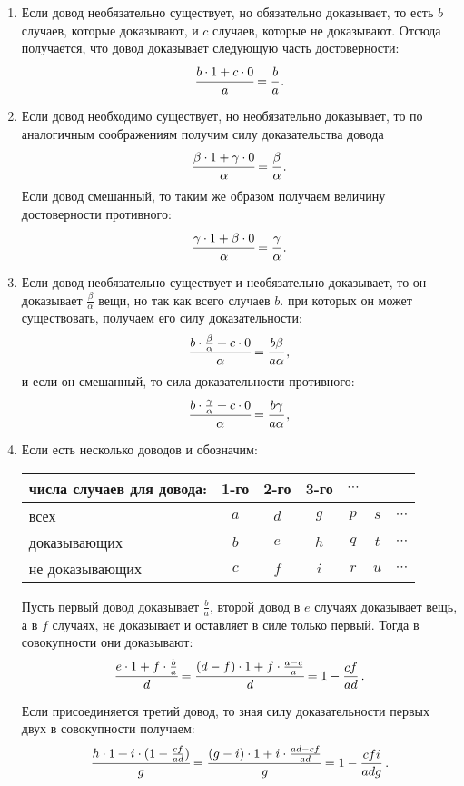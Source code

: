 \documentclass[12pt]{extarticle}
\begin{document}
\begin{enumerate}
\item Если довод необязательно существует, но обязательно доказывает, то есть $b$ случаев, которые доказывают, и $c$ случаев, которые не доказывают. Отсюда получается, что довод доказывает следующую часть достоверности: $$\cfrac{b \cdot 1 + c \cdot 0}{a} = \cfrac{b}{a} \, .$$

\item Если довод необходимо существует, но необязательно доказывает, то по аналогичным соображениям получим силу доказательства довода $$\cfrac{\beta \cdot 1 + \gamma \cdot 0}{\alpha} = \cfrac{\beta}{\alpha} \, .$$
Если довод смешанный, то таким же образом получаем величину достоверности противного: $$\cfrac{\gamma \cdot 1 + \beta \cdot 0}{\alpha} = \cfrac{\gamma}{\alpha} \, .$$

\item Если довод необязательно существует и необязательно доказывает, то он доказывает $\frac{\beta}{\alpha}$ вещи, но так как всего случаев $b$. при которых он может существовать, получаем его силу доказательности: $$\cfrac{b \cdot \frac{\beta}{\alpha} + c \cdot 0}{\alpha} = \cfrac{b \beta}{a \alpha}  \, ,$$
и если он смешанный, то сила доказательности противного:$$\cfrac{b \cdot \frac{\gamma}{\alpha} + c \cdot 0}{\alpha} = \cfrac{b \gamma}{a \alpha} \, ,$$

\item Если есть несколько доводов и обозначим:

\hspace{5pt}
\begin{tabular}{l|cccccc}
числа случаев для довода: & 1-го & 2-го & 3-го & $\cdots$  \\
\hline
всех & $a$ & $d$ & $g$ & $p$ & $s$ & $\cdots$ \\
доказывающих & $b$ & $e$ & $h$ & $q$ & $t$ &$\cdots$ \\
не доказывающих & $c$ & $f$ & $i$ & $r$ & $u$ & $\cdots$ \\
\end{tabular}

\hspace{5pt}
Пусть первый довод доказывает $\frac{b}{a}$, второй довод в $e$ случаях доказывает вещь, а в $f$ случаях, не доказывает и оставляет в силе только первый. Тогда в совокупности они доказывают:
$$\cfrac{e \cdot 1 + f \cdot \frac{b}{a}}{d} = \cfrac{(d - f) \cdot 1 +f \cdot \frac{a - c}{a}}{d} = 1 - \frac{cf}{ad} \, .$$

Если присоединяется третий довод, то зная силу доказательности первых двух в совокупности получаем:
$$\cfrac{h \cdot 1 + i \cdot (1 - \frac{cf}{ad})}{g} = \cfrac{(g - i) \cdot 1 + i \cdot \frac{ad - cf}{ad}}{g} = 1 - \frac{cfi}{adg} \, .$$


\end{enumerate}
\end{document}
